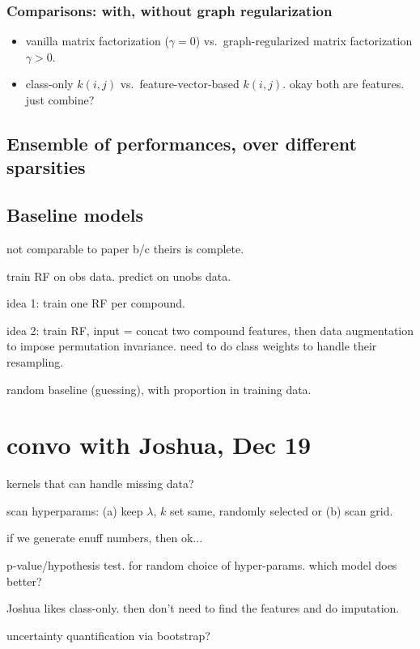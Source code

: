 \documentclass[11pt, oneside]{article}
\begin{document}
\subsubsection{Comparisons: with, without graph regularization}
  \begin{itemize}
   \item vanilla matrix factorization ($\gamma=0$) vs.\ graph-regularized matrix factorization $\gamma > 0$.
   \item class-only $k(i,j)$ vs.\ feature-vector-based $k(i, j)$. okay both are features. just combine?
  \end{itemize}


\subsection{Ensemble of performances, over different sparsities}

\subsection{Baseline models}

not comparable to paper b/c theirs is complete.

train RF on obs data. predict on unobs data.

idea 1: train one RF per compound. 

idea 2: train RF, input = concat two compound features, then data augmentation to impose permutation invariance. need to do class weights to handle their resampling. 

random baseline (guessing), with proportion in training data.

\section{convo with Joshua, Dec 19}
kernels that can handle missing data?

scan hyperparams: (a) keep $\lambda$, $k$ set same, randomly selected or (b) scan grid.

if we generate enuff numbers, then ok...

p-value/hypothesis test. for random choice of hyper-params. which model does better?

Joshua likes class-only. then don't need to find the features and do imputation. 




uncertainty quantification via bootstrap?



\end{document}
